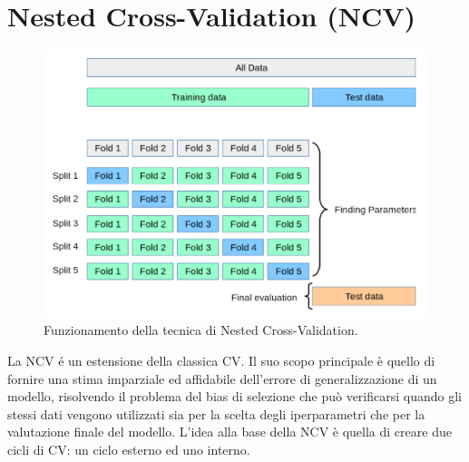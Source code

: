 \documentclass[a4paper,12pt]{report}
\begin{document}
	\section{Nested Cross-Validation (NCV)}
	\begin{figure}[H]
		\centering
		\includegraphics[width=1.0\textwidth]{img/ncv.png}
		\caption{Funzionamento della tecnica di Nested Cross-Validation.}
	\end{figure}
	La NCV é un estensione della classica CV. Il suo scopo principale è quello di fornire una stima imparziale ed affidabile dell'errore di generalizzazione di un modello, risolvendo il problema del bias di selezione che può verificarsi quando gli stessi dati vengono utilizzati sia per la scelta degli iperparametri che per la valutazione finale del modello. L'idea alla base della NCV è quella di creare due cicli di CV: un ciclo esterno ed uno interno. 
	
\end{document}
